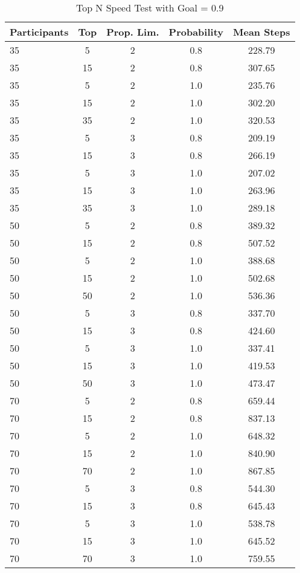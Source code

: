 \documentclass[11pt]{article}
\begin{document}
\begin{table}[H]
\caption{Top N Speed Test with Goal = 0.9}
\label{top}
\vspace{3mm}
\centering
\begin{tabular}{lcccc}
\toprule
\multicolumn{1}{l}{Participants}  & \multicolumn{1}{c}{Top} & \multicolumn{1}{c}{Prop. Lim.} & \multicolumn{1}{c}{Probability} & \multicolumn{1}{c}{Mean Steps}  \\
\midrule
35 & 5 & 2 & 0.8 & 228.79 \\
35 & 15 & 2 & 0.8 & 307.65 \\
35 & 5 & 2 & 1.0 & 235.76 \\
35 & 15 & 2 & 1.0 & 302.20 \\
35 & 35 & 2 & 1.0 & 320.53\\
35 & 5 & 3 & 0.8 & 209.19 \\
35 & 15 & 3 & 0.8 & 266.19 \\
35 & 5 & 3 & 1.0 & 207.02 \\
35 & 15 & 3 & 1.0 & 263.96 \\
35 & 35 & 3 & 1.0 & 289.18\\
50 & 5 & 2 & 0.8 & 389.32 \\
50 & 15 & 2 & 0.8 & 507.52 \\
50 & 5 & 2 & 1.0 & 388.68 \\
50 & 15 & 2 & 1.0 & 502.68 \\
50 & 50 & 2 & 1.0 & 536.36\\
50 & 5 & 3 & 0.8 & 337.70 \\
50 & 15 & 3 & 0.8 & 424.60 \\
50 & 5 & 3 & 1.0 & 337.41 \\
50 & 15 & 3 & 1.0 & 419.53 \\
50 & 50 & 3 & 1.0 & 473.47\\
70 & 5 & 2 & 0.8 & 659.44 \\
70 & 15 & 2 & 0.8 & 837.13 \\
70 & 5 & 2 & 1.0 & 648.32 \\
70 & 15 & 2 & 1.0 & 840.90 \\
70 & 70 & 2 & 1.0 & 867.85\\
70 & 5 & 3 & 0.8 & 544.30 \\
70 & 15 & 3 & 0.8 & 645.43 \\
70 & 5 & 3 & 1.0 & 538.78 \\
70 & 15 & 3 & 1.0 & 645.52 \\
70 & 70 & 3 & 1.0 & 759.55\\
\bottomrule
\end{tabular}
\end{table}
\end{document}
